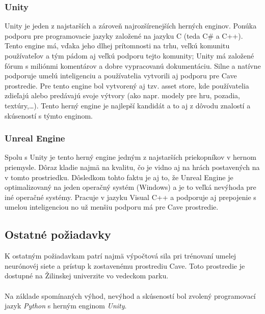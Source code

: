 \subsubsection{Unity}
Unity je jeden z najstarších a zároveň najrozšírenejších herných enginov.\cite{game_engine_unity}
Ponúka podporu pre programovacie jazyky založené na jazyku C (teda C\# a C++).
Tento engine má, vďaka jeho dlhej prítomnosti na trhu, veľkú komunitu používateľov a tým pádom aj veľkú podporu tejto
komunity;
Unity má založené fórum s miliónmi komentárov a dobre vypracovanú dokumentáciu.
Silne a natívne podporuje umelú inteligenciu\cite{game_engine_unity_ml_agents} a používatelia vytvorili aj podporu pre
Cave prostredie\cite{game_engine_unity_kave}.
Pre tento engine bol vytvorený aj tzv. asset store, kde používatelia zdieľajú alebo predávajú svoje výtvory (ako napr.
modely pre hru, pozadia, textúry,\dots).
Tento herný engine je najlepší kandidát a to aj z dôvodu znalostí a skúseností s týmto enginom.

\subsubsection{Unreal Engine}
Spolu s Unity je tento herný engine jedným z najstarších priekopníkov v hernom
priemysle.\cite{game_engine_unreal_engine}
Dôraz kladie najmä na kvalitu, čo je vidno aj na hrách postavených na v tomto prostriedku.
Dôsledkom tohto faktu je aj to, že Unreal Engine je optimalizovaný na jeden operačný systém (Windows) a je to veľká
nevýhoda pre iné operačné systémy.
Pracuje v jazyku Visual C++ a podporuje aj prepojenie s umelou inteligenciou no už menšiu podporu má pre Cave
prostredie.

\subsection{Ostatné požiadavky}\label{subsec:requirements-other}

K ostatným požiadavkam patrí najmä výpočtová sila pri trénovaní umelej neurónovéj siete a prístup k zostavenému
prostrediu Cave.
Toto prostredie je dostupné na Žilinskej univerzite vo vedeckom parku.
\\
\\
Na základe spomínaných výhod, nevýhod a skúseností bol zvolený programovací jazyk \emph{Python} s herným enginom
\emph{Unity}.

